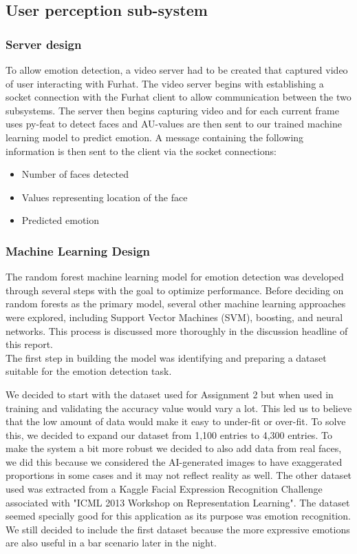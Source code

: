 \documentclass[conference]{IEEEtran}
\begin{document}
\subsection{User perception sub-system}

\subsubsection{Server design}\label{sec:serverdesign}
To allow emotion detection, a video server had to be created that captured video of user interacting with Furhat. The video server begins with establishing a socket connection with the Furhat client to allow communication between the two subsystems. The server then begins capturing video and for each current frame uses py-feat to detect faces and AU-values are then sent to our trained machine learning model to predict emotion. A message containing the following information is then sent to the client via the socket connections:
\begin{itemize}
    \item Number of faces detected
    \item Values representing location of the face
    \item Predicted emotion
\end{itemize}
\subsubsection{Machine Learning Design}
The random forest machine learning model for emotion detection was developed through several steps with the goal to optimize performance. Before deciding on random forests as the primary model, several other machine learning approaches were explored, including Support Vector Machines (SVM), boosting, and neural networks. This process is discussed more thoroughly in the discussion headline of this report.\\ The first step in building the model was identifying and preparing a dataset suitable for the emotion detection task.

We decided to start with the dataset used for Assignment 2 but when used in training and validating the accuracy value would vary a lot. This led us to believe that the low amount of data would make it easy to under-fit or over-fit. To solve this, we decided to expand our dataset from 1,100 entries to 4,300 entries. To make the system a bit more robust we decided to also add data from real faces, we did this because we considered the AI-generated images to have exaggerated proportions in some cases and it may not reflect reality as well. The other dataset used was extracted from a Kaggle Facial Expression Recognition Challenge \cite{kaggle} associated with "ICML 2013 Workshop on Representation Learning". The dataset seemed specially good for this application as its purpose was emotion recognition.
We still decided to include the first dataset because the more expressive emotions are also useful in a bar scenario later in the night.
\end{document}
